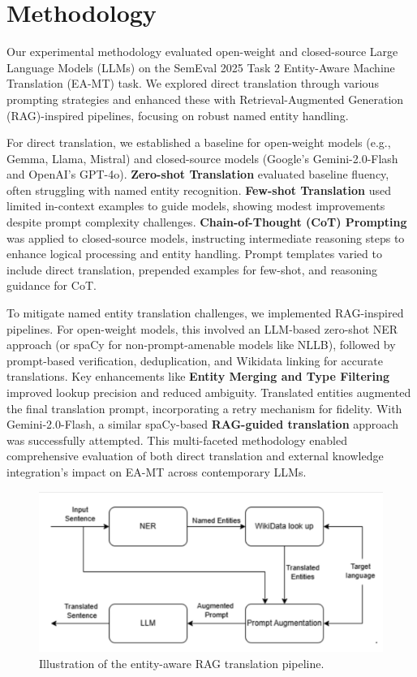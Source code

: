 \documentclass[final]{ecai}
\begin{document}
\section{Methodology}
\label{sec:methodology}
Our experimental methodology evaluated open-weight and closed-source Large Language Models (LLMs) on the SemEval 2025 Task 2 Entity-Aware Machine Translation (EA-MT) task. 
We explored direct translation through various prompting strategies and enhanced these with Retrieval-Augmented Generation (RAG)-inspired pipelines, focusing on robust named entity handling.

For direct translation, we established a baseline for open-weight models (e.g., Gemma, Llama, Mistral) and closed-source models (Google's Gemini-2.0-Flash and OpenAI's GPT-4o). 
\textbf{Zero-shot Translation} evaluated baseline fluency, often struggling with named entity recognition. \textbf{Few-shot Translation} used limited in-context examples to guide models, 
showing modest improvements despite prompt complexity challenges. \textbf{Chain-of-Thought (CoT) Prompting} was applied to closed-source models, instructing intermediate reasoning 
steps to enhance logical processing and entity handling. Prompt templates varied to include direct translation, prepended examples for few-shot, and reasoning guidance for CoT.

To mitigate named entity translation challenges, we implemented RAG-inspired pipelines. For open-weight models, this involved an LLM-based zero-shot NER approach 
(or spaCy for non-prompt-amenable models like NLLB), followed by prompt-based verification, deduplication, and Wikidata linking for accurate translations.
Key enhancements like \textbf{Entity Merging and Type Filtering} improved lookup precision and reduced ambiguity. Translated entities augmented 
the final translation prompt, incorporating a retry mechanism for fidelity. With Gemini-2.0-Flash, a similar spaCy-based \textbf{RAG-guided translation} approach 
was successfully attempted. This multi-faceted methodology enabled comprehensive evaluation of both direct translation and external knowledge 
integration's impact on EA-MT across contemporary LLMs.

\begin{figure}[h!]
    \centering
    \includegraphics[width=1.0\linewidth]{rag.png}
    \caption{Illustration of the entity-aware RAG translation pipeline.}
    \label{fig:entity_pipeline}
\end{figure}
\end{document}
